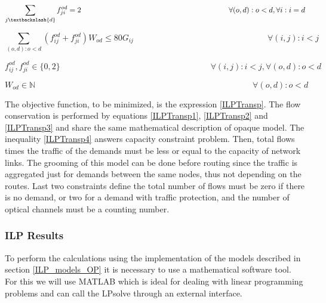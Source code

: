 \begin{equation}
\sum_{j\textbackslash \{d\}} f_{ji}^{od} = 2  \qquad \qquad \qquad \qquad \qquad \qquad \qquad \qquad \qquad \qquad
\forall(o,d) : o < d, \forall i: i = d
\label{ILPTransp3}
\end{equation}

\begin{equation}
\sum_{(o,d):o<d} \left(f_{ij}^{od} + f_{ji}^{od}\right) W_{od} \leq 80 G_{ij} \qquad \qquad \qquad \qquad \qquad \qquad \qquad \qquad
\forall(i,j) : i < j
\label{ILPTransp4}
\end{equation}

\begin{equation}
f_{ij}^{od} , f_{ji}^{od} \in \{0,2\}   \qquad \qquad \qquad \qquad \qquad \qquad \qquad \qquad \qquad
\forall(i,j) : i < j, \forall(o,d) : o < d
\label{ILPTransp5}
\end{equation}

\begin{equation}
W_{od} \in \mathbb{N}  \qquad \qquad \qquad \qquad \qquad \qquad \qquad \qquad \qquad \qquad \qquad \qquad \qquad
\forall(o,d) : o < d
\label{ILPTransp6}
\end{equation}


The objective function, to be minimized, is the expression \ref{ILPTransp}. The flow conservation is performed by equations \ref{ILPTransp1}, \ref{ILPTransp2} and \ref{ILPTransp3} and share the same mathematical description of opaque model. The inequality \ref{ILPTransp4} answers capacity constraint problem. Then, total flows times the traffic of the demands must be less or equal to the capacity of network links. The grooming of this model can be done before routing since the traffic is aggregated just for demands between the same nodes, thus not depending on the routes. Last two constraints define the total number of flows must be zero if there is no demand, or two for a demand with traffic protection, and the number of optical channels must be a counting number.

\subsubsection{ILP Results}

\vspace{11pt}
To perform the calculations using the implementation of the models described in section \ref{ILP_models_OP} it is necessary to use a mathematical software tool. For this we will use MATLAB which is ideal for dealing with linear programming problems and can call the LPsolve through an external interface. \\

